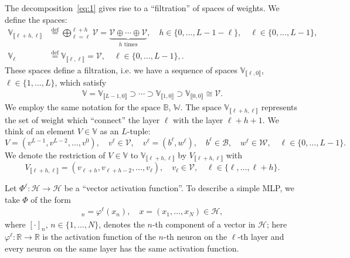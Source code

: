 \documentclass[10pt, a4paper]{article}
\theoremstyle{plain}
\theoremstyle{definition}
\theoremstyle{definition}
\theoremstyle{definition}
\theoremstyle{definition}
\theoremstyle{definition}
\theoremstyle{definition}
\theoremstyle{definition}
\theoremstyle{remark}
\theoremstyle{remark}
\theoremstyle{rudin-style-generic}
\theoremstyle{rudin-style-generic*}
\theoremstyle{rudin-style-theorem}
\newcommand{\deq}{\stackrel{\mathrm{def}}{=}}
\newcommand{\RR}{\mathbb R}
\begin{document}
  The decomposition~\eqref{eq:1} gives rise to a ``filtration'' of spaces of weights.
  We define the spaces:
  \begin{align*}
    \mathbb V_{\llbracket \ell +h,\ell\rrbracket} &\deq \bigoplus_{\ell=\ell}^{\ell+h} \mathcal V = \underbrace{\mathcal V\oplus\cdots\oplus\mathcal V}_{h \text{ times}}
                                                    ,  \quad h\in\{0,\dots,L-1 -\ell\} ,  \quad\ell\in\{0,\dots,L-1\} ,\\
    \mathbb V_{\ell}&\deq \mathbb V_{\llbracket \ell,\ell \rrbracket} = \mathcal V ,\quad \ell\in\{0,\dots,L-1\},
    .
  \end{align*}
  These spaces define a filtration,
  i.e. we have a sequence of spaces $\mathbb V_{\llbracket \ell ,0 \rrbracket}$, $\ell\in\{1,\dots,L\}$, which satisfy
  \begin{align*}
    \mathbb V 
    =\mathbb V_{\llbracket L -1,0 \rrbracket}\supset 
     \cdots\supset \mathbb V_{\llbracket 1 ,0 \rrbracket} \supset\mathbb V_{\llbracket 0 ,0 \rrbracket}  \cong\mathcal V
    .
  \end{align*}
  We employ the same notation for the space $\mathbb B$, $\mathbb W$.
  The space $\mathbb V_{\llbracket \ell+h,\ell\rrbracket}$ represents the set of weight which ``connect'' the layer $\ell$ with the layer $\ell+h+1$.
  We think of an element $V\in\mathbb V$ as an $L$-tuple:
  \begin{equation*}
    V = (v^{L-1},v^{L-2},\dots,v^{0}), \quad v^\ell\in\mathcal V,\quad v^\ell=(b^\ell,w^\ell), \quad b^\ell\in\mathcal B, \quad w^\ell\in\mathcal W, \quad \ell\in\{0,\dots,L-1\}
    .
  \end{equation*}
  We denote the restriction of $V\in\mathbb V$ to $\mathbb V_{\llbracket \ell+h,\ell\rrbracket}$ by $V_{\llbracket\ell+h,\ell\rrbracket}$ with
  \begin{equation*}
    V_{\llbracket\ell+h,\ell\rrbracket} = (v_{\ell+h},v_{\ell+h-2},\dots,v_{\ell}), \quad v_\ell\in\mathcal V,\quad \ell\in\{\ell,\dots,\ell+h\}
    .
  \end{equation*}
  
  Let $\Phi^\ell:\mathcal H\rightarrow\mathcal H$ be a ``vector activation function''.
  To describe a simple MLP, we take $\Phi$ of the form
  \begin{align*}
    [\Phi^\ell( x )]_n = \varphi^\ell( x_n ), \quad x=(x_1,\dots,x_N)\in\mathcal H
    ,
  \end{align*}
  where $[\cdot]_n$, $n\in\{1,\dots,N\}$, denotes the $n$-th component of a vector in $\mathcal H$;
  here $\varphi^\ell:\RR\rightarrow\RR$ is the activation function of the $n$-th neuron on the $\ell$-th
  layer and every neuron on the same layer has the same activation function.
  
\end{document}
